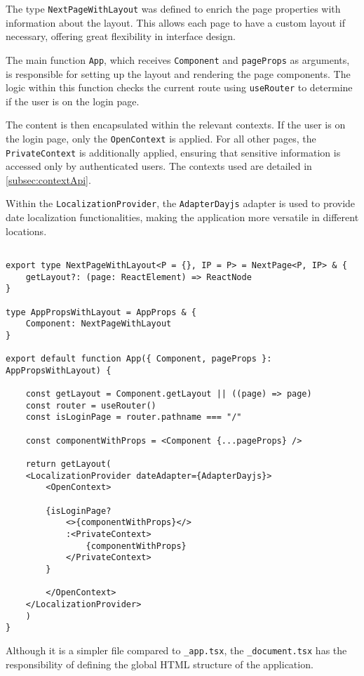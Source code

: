 The type \texttt{NextPageWithLayout} was defined to enrich the page properties with information about the layout. This allows each page to have a custom layout if necessary, offering great flexibility in interface design.

The main function \texttt{App}, which receives \texttt{Component} and \texttt{pageProps} as arguments, is responsible for setting up the layout and rendering the page components. The logic within this function checks the current route using \texttt{useRouter} \cite{nextjsUseRouter} to determine if the user is on the login page.

The content is then encapsulated within the relevant contexts. If the user is on the login page, only the \texttt{OpenContext} is applied. For all other pages, the \texttt{PrivateContext} is additionally applied, ensuring that sensitive information is accessed only by authenticated users. The contexts used are detailed in \ref{subsec:contextApi}.

Within the \texttt{LocalizationProvider}, the \texttt{AdapterDayjs} adapter is used to provide date localization functionalities, making the application more versatile in different locations.


\begin{Verbatim}[fontsize=\small, baselinestretch=0.8]

export type NextPageWithLayout<P = {}, IP = P> = NextPage<P, IP> & {
    getLayout?: (page: ReactElement) => ReactNode
}

type AppPropsWithLayout = AppProps & {
    Component: NextPageWithLayout
}

export default function App({ Component, pageProps }:
AppPropsWithLayout) {

    const getLayout = Component.getLayout || ((page) => page)
    const router = useRouter()
    const isLoginPage = router.pathname === "/"

    const componentWithProps = <Component {...pageProps} /> 

    return getLayout(
    <LocalizationProvider dateAdapter={AdapterDayjs}>
        <OpenContext>

        {isLoginPage?
            <>{componentWithProps}</>
            :<PrivateContext>
                {componentWithProps}
            </PrivateContext>
        }

        </OpenContext>  
    </LocalizationProvider>
    )
}
\end{Verbatim}

Although it is a simpler file compared to \texttt{\_app.tsx}, the \texttt{\_document.tsx} has the responsibility of defining the global HTML structure of the application.

